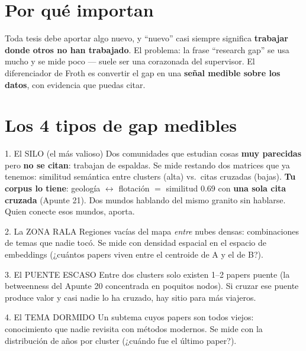 \documentclass[11pt,a4paper]{article}
\begin{document}

\section{Por qué importan}

Toda tesis debe aportar algo nuevo, y ``nuevo'' casi siempre significa \textbf{trabajar donde
otros no han trabajado}. El problema: la frase ``research gap'' se usa mucho y se mide poco —
suele ser una corazonada del supervisor. El diferenciador de Froth es convertir el gap en
una \textbf{señal medible sobre los datos}, con evidencia que puedas citar.

\section{Los 4 tipos de gap medibles}

\begin{concepto}{1. El SILO (el más valioso)}
Dos comunidades que estudian cosas \textbf{muy parecidas} pero \textbf{no se citan}: trabajan
de espaldas. Se mide restando dos matrices que ya tenemos: similitud semántica entre clusters
(alta) vs.\ citas cruzadas (bajas). \textbf{Tu corpus lo tiene}: geología $\leftrightarrow$
flotación $=$ similitud 0.69 con \textbf{una sola cita cruzada} (Apunte 21). Dos mundos
hablando del mismo granito sin hablarse. Quien conecte esos mundos, aporta.
\end{concepto}

\begin{concepto}{2. La ZONA RALA}
Regiones vacías del mapa \emph{entre} nubes densas: combinaciones de temas que nadie tocó.
Se mide con densidad espacial en el espacio de embeddings (¿cuántos papers viven entre el
centroide de A y el de B?).
\end{concepto}

\begin{concepto}{3. El PUENTE ESCASO}
Entre dos clusters solo existen 1--2 papers puente (la betweenness del Apunte 20 concentrada
en poquitos nodos). Si cruzar ese puente produce valor y casi nadie lo ha cruzado, hay sitio
para más viajeros.
\end{concepto}

\begin{concepto}{4. El TEMA DORMIDO}
Un subtema cuyos papers son todos viejos: conocimiento que nadie revisita con métodos
modernos. Se mide con la distribución de años por cluster (¿cuándo fue el último paper?).
\end{concepto}
\end{document}
